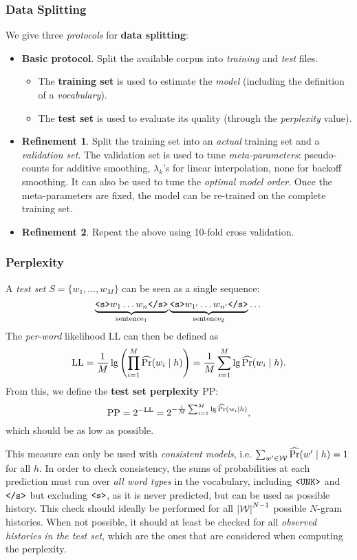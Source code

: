 \subsubsection{Data Splitting}
We give three \emph{protocols} for \textbf{data splitting}:
\begin{itemize}
	\item \textbf{Basic protocol}.
	Split the available corpus into \emph{training} and \emph{test} files.
	\begin{itemize}
		\item The \textbf{training set} is used to estimate the \emph{model} (including the definition of a \emph{vocabulary}).
		\item The \textbf{test set} is used to evaluate its quality (through the \emph{perplexity} value).
	\end{itemize}
	\item \textbf{Refinement 1}.
	Split the training set into an \emph{actual} training set and a \emph{validation set}.
	The validation set is used to tune \emph{meta-parameters}: pseudo-counts for additive smoothing, \(\lambda_k\)'s for linear interpolation, none for backoff smoothing.
	It can also be used to tune the \emph{optimal model order}.
	Once the meta-parameters are fixed, the model can be re-trained on the complete training set.
	\item \textbf{Refinement 2}.
	Repeat the above using 10-fold cross validation.
\end{itemize}

\subsubsection{Perplexity}
A \emph{test set} \(S = \{w_1, \dots, w_M\}\) can be seen as a single sequence:
\[
\underbrace{\texttt{<s>} w_1 \dots w_n \texttt{</s>}}_{\textnormal{sentence}_1} \underbrace{\texttt{<s>} w_{1'} \dots w_{n'} \texttt{</s>}}_{\textnormal{sentence}_2} \dots
\]
The \emph{per-word} likelihood LL can then be defined as
\[
\textnormal{LL} = \frac{1}{M} \lg\left(\prod_{i=1}^M \operatorname{\widehat{\Pr}}(w_i \mid h)\right) = \frac{1}{M} \sum_{i=1}^M \lg \operatorname{\widehat{\Pr}}(w_i \mid h).
\]
From this, we define the \textbf{test set perplexity} PP:
\[
\textnormal{PP} = 2^{-\textnormal{LL}} = 2^{-\frac{1}{M} \sum_{i=1}^M \lg \operatorname{\widehat{\Pr}}(w_i \mid h)},
\]
which should be as low as possible.

This measure can only be used with \emph{consistent models}, i.e. \(\sum_{w' \in \mathcal{W}} \operatorname{\widehat{\Pr}}(w' \mid h) = 1\) for all \(h\).
In order to check consistency, the sums of probabilities at each prediction must run over \emph{all word types} in the vocabulary, including \(\texttt{<UNK>}\) and \(\texttt{</s>}\) but excluding \(\texttt{<s>}\), as it is never predicted, but can be used as possible history.
This check should ideally be performed for all \({\left\lvert\mathcal{W}\right\lvert}^{N-1}\) possible \(N\)-gram histories.
When not possible, it should at least be checked for all \emph{observed histories in the test set}, which are the ones that are considered when computing the perplexity.


